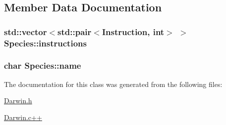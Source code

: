 \subsection{Member Data Documentation}
\hypertarget{classSpecies_a362b2f3be5cfd3908e63a51f1224a70b}{
\subsubsection[{instructions}]{\setlength{\rightskip}{0pt plus 5cm}std\-::vector$<$std\-::pair$<${\bf Instruction}, int$>$ $>$ Species\-::instructions}}\label{classSpecies_a362b2f3be5cfd3908e63a51f1224a70b}
\hypertarget{classSpecies_aafe22c0666abe0f9680cd21fea21e677}{
\subsubsection[{name}]{\setlength{\rightskip}{0pt plus 5cm}char Species\-::name}}\label{classSpecies_aafe22c0666abe0f9680cd21fea21e677}


The documentation for this class was generated from the following files\-:\begin{DoxyCompactItemize}
\item 
\hyperlink{Darwin_8h}{Darwin.\-h}\item 
\hyperlink{Darwin_8c_09_09}{Darwin.\-c++}\end{DoxyCompactItemize}
